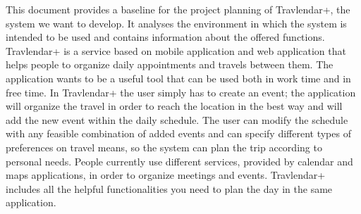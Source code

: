 This document provides a baseline for the project planning of Travlendar+, the system we want to develop. It analyses the environment in which the system is intended to be used and contains information about the offered functions.
\newline
\newline
Travlendar+ is a service based on mobile application and web application that helps people to organize daily appointments and travels between them. The application wants to be a useful tool that can be used both in work time and in free time. In Travlendar+ the user simply has to create an event; the application will organize the travel in order to reach the location in the best way and will add the new event within the daily schedule. The user can modify the schedule with any feasible combination of added events and can specify different types of preferences on travel means, so the system can plan the trip according to personal needs.
\newline
\newline
People currently use different services, provided by calendar and maps applications, in order to organize meetings and events. Travlendar+ includes all the helpful functionalities you need to plan the day in the same application.

